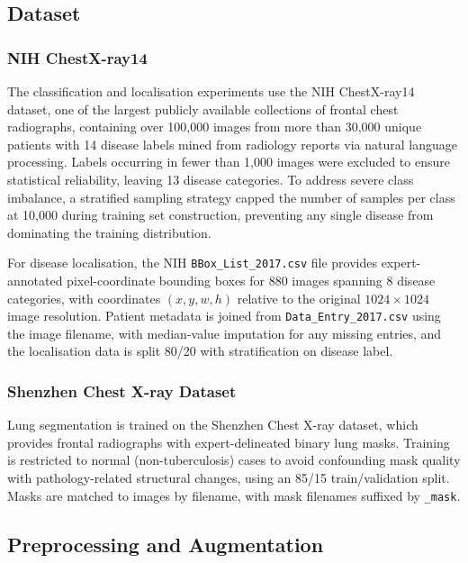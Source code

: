 \documentclass[preprint,12pt,authoryear]{elsarticle}
\begin{document}
\subsection{Dataset}
\label{sec:dataset}

\subsubsection{NIH ChestX-ray14}

The classification and localisation experiments use the NIH ChestX-ray14 dataset, one of the largest publicly available collections of frontal chest radiographs, containing over 100{,}000 images from more than 30{,}000 unique patients with 14 disease labels mined from radiology reports via natural language processing. Labels occurring in fewer than 1{,}000 images were excluded to ensure statistical reliability, leaving 13 disease categories. To address severe class imbalance, a stratified sampling strategy capped the number of samples per class at 10{,}000 during training set construction, preventing any single disease from dominating the training distribution.

For disease localisation, the NIH \texttt{BBox\_List\_2017.csv} file provides expert-annotated pixel-coordinate bounding boxes for 880 images spanning 8 disease categories, with coordinates $(x, y, w, h)$ relative to the original $1024 \times 1024$ image resolution. Patient metadata is joined from \texttt{Data\_Entry\_2017.csv} using the image filename, with median-value imputation for any missing entries, and the localisation data is split 80/20 with stratification on disease label.

\subsubsection{Shenzhen Chest X-ray Dataset}

Lung segmentation is trained on the Shenzhen Chest X-ray dataset, which provides frontal radiographs with expert-delineated binary lung masks. Training is restricted to normal (non-tuberculosis) cases to avoid confounding mask quality with pathology-related structural changes, using an 85/15 train/validation split. Masks are matched to images by filename, with mask filenames suffixed by \texttt{\_mask}.

\subsection{Preprocessing and Augmentation}
\label{sec:preprocessing}
\end{document}
